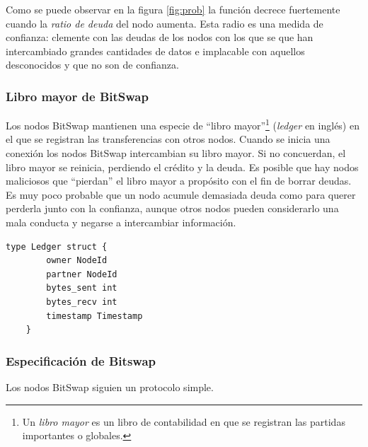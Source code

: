 \documentclass[12pt]{article} %
\begin{document}
Como se puede observar en la figura \ref{fig:prob} la función decrece fuertemente cuando la \textit{ratio de deuda} del nodo aumenta. Esta radio es una medida de confianza: clemente con las deudas de los nodos con los que se que han intercambiado grandes cantidades de datos e implacable con  aquellos desconocidos y que no son de confianza.


\subsubsection{Libro mayor de BitSwap} %
\label{ssub:libro_mayor_de_bitswap}

Los nodos BitSwap mantienen una especie de ``libro mayor''\footnote{Un \textit{libro mayor} es un libro de contabilidad en que se registran las partidas importantes o globales.} (\textit{ledger} en inglés) en el que se registran las transferencias con otros nodos. Cuando se inicia una conexión los nodos BitSwap intercambian su libro mayor. Si no concuerdan, el libro mayor se reinicia, perdiendo el crédito y la deuda. Es posible que hay nodos maliciosos que ``pierdan'' el libro mayor a propósito con el fin de borrar deudas. Es muy poco probable que un nodo acumule demasiada deuda como para querer perderla junto con la confianza, aunque otros nodos pueden considerarlo una mala conducta y negarse a intercambiar información.

\begin{lstlisting}[caption={Implementación del libro mayor.}, language=Golang]
	type Ledger struct {
		owner NodeId
		partner NodeId
		bytes_sent int
		bytes_recv int
		timestamp Timestamp
	}
\end{lstlisting}


\subsubsection{Especificación de Bitswap} %
\label{ssub:especificación_de_bitswap}

Los nodos BitSwap siguien un protocolo simple.
\end{document}
